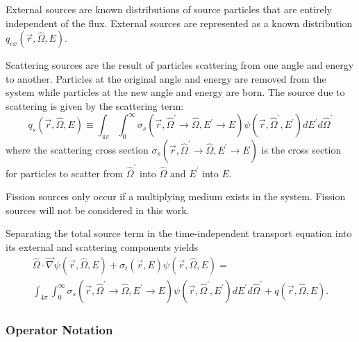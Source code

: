 External sources are known distributions of source particles that are entirely independent of the flux.
External sources are represented as a known distribution $q_{ex}\left(\vec{r},\hat{\Omega},E\right)$.

Scattering sources are the result of particles scattering from one angle and energy to another.
Particles at the original angle and energy are removed from the system while particles at the new angle and energy are born.
The source due to scattering is given by the scattering term:
\begin{equation}\label{eq:bg:rt:source_scattering_term}
  q_s\left(\vec{r},\hat{\Omega},E\right) \equiv
  \int_{4\pi}\int_0^\infty\sigma_s\left(\vec{r},\hat{\Omega}^\prime\rightarrow\hat{\Omega},E^\prime\rightarrow E\right)\psi\left(\vec{r},\hat{\Omega}^\prime,E^\prime\right)dE^\prime d\hat{\Omega}^\prime
\end{equation}
where the scattering cross section $\sigma_s\left(\vec{r},\hat{\Omega}^\prime\rightarrow\hat{\Omega},E^\prime\rightarrow E\right)$ is the cross section for particles to scatter from $\hat{\Omega}^\prime$ into $\hat{\Omega}$ and $E^\prime$ into $E$.

Fission sources only occur if a multiplying medium exists in the system.
Fission sources will not be considered in this work.

Separating the total source term in the time-independent transport equation into its external and scattering components yields
\begin{multline}\label{eq:bg:rt:transport_equation}
  \hat{\Omega}\cdot\vec{\nabla}\psi\left(\vec{r},\hat{\Omega},E\right) +
  \sigma_t\left(\vec{r},E\right)\psi\left(\vec{r},\hat{\Omega},E\right) = \\
  \int_{4\pi}\int_0^\infty\sigma_s\left(\vec{r},\hat{\Omega}^\prime\rightarrow\hat{\Omega},E^\prime\rightarrow E\right)\psi\left(\vec{r},\hat{\Omega}^\prime,E^\prime\right)dE^\prime d\hat{\Omega}^\prime +
  q\left(\vec{r},\hat{\Omega},E\right).
\end{multline}

\subsubsection{Operator Notation}
\label{sec:bg:rt:te:on}

